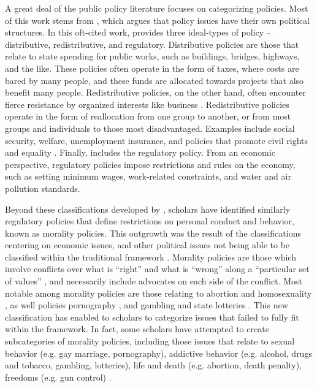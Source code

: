 A great deal of the public policy literature focuses on categorizing policies. Most of this work stems from \citet{lowi_1964,lowi_1969}, which argues that policy issues have their own political structures. In this oft-cited work, \citet{lowi_1964} provides three ideal-types of policy -- distributive, redistributive, and regulatory. Distributive policies are those that relate to state spending for public works, such as buildings, bridges, highways, and the like. These policies often operate in the form of taxes, where costs are bared by many people, and these funds are allocated towards projects that also benefit many people. Redistributive policies, on the other hand, often encounter fierce resistance by organized interests like business \citep{amenta_2000,amenta_and_elliott_2019}. Redistributive policies operate in the form of reallocation from one group to another, or from most groups and individuals to those most disadvantaged. Examples include social security, welfare, unemployment insurance, and policies that promote civil rights and equality \citep{hicks_1998,korpi_1978}. Finally, \citet{lowi_1964} includes the regulatory policy. From an economic perspective, regulatory policies impose restrictions and rules on the economy, such as setting minimum wages, work-related constraints, and water and air pollution standards. 

Beyond these classifications developed by \citet{lowi_1964}, scholars have identified similarly regulatory policies that define restrictions on personal conduct and behavior, known as morality policies. This outgrowth was the result of the \citet{lowi_1964} classifications centering on economic issues, and other political issues not being able to be classified within the traditional framework \citep{mooney_and_schuldt_2008}. Morality policies are those which involve conflicts over what is ``right'' and what is ``wrong'' along a ``particular set of values'' \citep[675]{mooney_1999}, and necessarily include advocates on each side of the conflict. Most notable among morality policies are those relating to abortion and homosexuality \citep{camobreco_and_barnello_2018,haider_markel_1999,haider_markel_and_meier_1996}, as well policies pornography \citep{brisbin_2001,smith_2001}, and gambling and state lotteries \citep{pierce_and_miller_2004,von_herrmann_2002,pierce_and_miller_1999,berry_and_berry_1990}. This new classification has enabled to scholars to categorize issues that failed to fully fit within the \citet{lowi_1964} framework. In fact, some scholars have attempted to create subcategories of morality policies, including those issues that relate to sexual behavior (e.g. gay marriage, pornography), addictive behavior (e.g. alcohol, drugs and tobacco, gambling, lotteries), life and death (e.g. abortion, death penalty), freedoms (e.g. gun control) \citep{mooney_2001}. 


